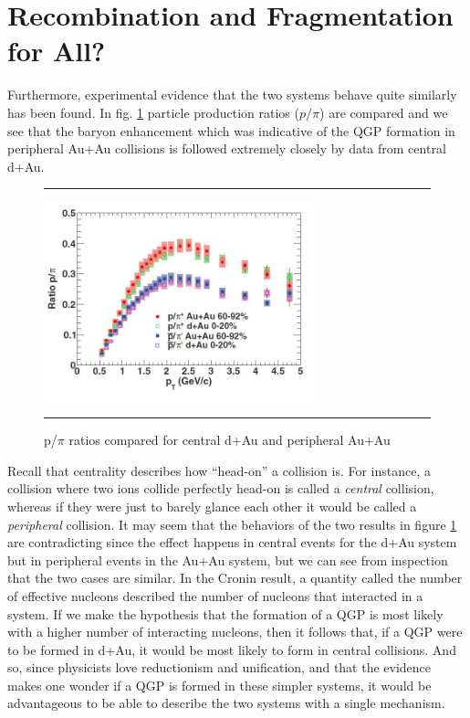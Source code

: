 \section{Recombination and Fragmentation for All?}
\label{sect:recombcold}
Furthermore, experimental evidence that the two systems behave quite similarly has been found. In fig. \ref{fig:daaaratios} particle production ratios ($p/\pi$) are compared and we see that the baryon enhancement which was indicative of the QGP formation in peripheral Au+Au collisions is followed extremely closely by data from central d+Au. 

\begin{figure}[htbp!]
  \centering    \rule{35em}{0.5pt}
    \includegraphics[width=0.7\textwidth]{prevplots/dAvsAAratios.JPG}

  \caption[p/$\pi$ ratios compared for central d+Au and peripheral Au+Au]{p/$\pi$ ratios compared for central d+Au and peripheral Au+Au\citep{PhysRevC.88.024906}}
  \label{fig:daaaratios}    \rule{35em}{0.5pt}
\end{figure} 

Recall that centrality describes how ``head-on'' a collision is. For instance, a collision where two ions collide perfectly head-on is called a \textit{central} collision, whereas if they were just to barely glance each other it would be called a \textit{peripheral} collision. It may seem that the behaviors of the two results in figure \ref{fig:daaaratios} are contradicting since the effect happens in central events for the d+Au system but in peripheral events in the Au+Au system, but we can see from inspection that the two cases are similar. In the Cronin result, a quantity called the number of effective nucleons described the number of nucleons that interacted in a system. If we make the hypothesis that the formation of a QGP is most likely with a higher number of interacting nucleons, then it follows that, if a QGP were to be formed in d+Au, it would be most likely to form in central collisions. And so, since physicists love reductionism and unification, and that the evidence makes one wonder if a QGP is formed in these simpler systems, it would be advantageous to be able to describe the two systems with a single mechanism.

